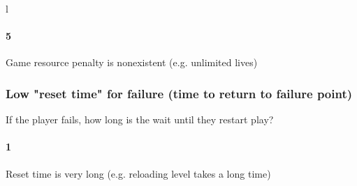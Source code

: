 l\paragraph{5}Game resource penalty is nonexistent (e.g. unlimited lives)\subsubsection{Low "reset time" for failure (time to return to failure point)}If the player fails, how long is the wait until they restart play?\paragraph{1}Reset time is very long (e.g. reloading level takes a long time)\p